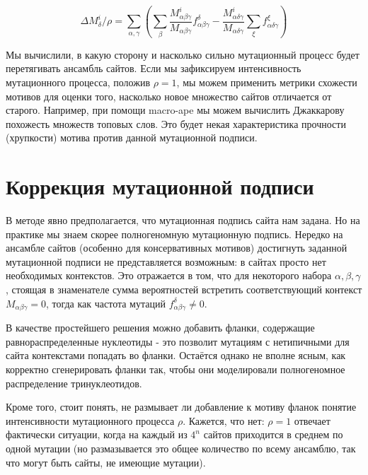 \documentclass[a4paper]{article}
\begin{document}
\begin{equation}
\boxed{
\Delta M^i_{\delta}/\rho = \sum_{\alpha,\gamma}\left(\sum_{\beta}\frac{M^i_{\alpha\beta\gamma}}{M_{\alpha\beta\gamma}}f_{\alpha\beta\gamma}^{\delta} - \frac{M^i_{\alpha\delta\gamma}}{M_{\alpha\delta\gamma}}\sum_{\xi}f_{\alpha\delta\gamma}^{\xi}\right)
}
\end{equation}

Мы вычислили, в какую сторону и насколько сильно мутационный процесс будет перетягивать ансамбль сайтов. Если мы зафиксируем интенсивность мутационного процесса, положив $\rho=1$, мы можем применить метрики схожести мотивов для оценки того, насколько новое множество сайтов отличается от старого. Например, при помощи macro-ape мы можем вычислить Джаккарову похожесть множеств топовых слов. Это будет некая характеристика прочности (хрупкости) мотива против данной мутационной подписи.


\section{Коррекция мутационной подписи}

В методе явно предполагается, что мутационная подпись сайта нам задана. Но на практике мы знаем скорее полногеномную мутационную подпись. Нередко на ансамбле сайтов (особенно для консервативных мотивов) достигнуть заданной мутационной подписи не представляется возможным: в сайтах просто нет необходимых контекстов. Это отражается в том, что для некоторого набора $\alpha, \beta, \gamma$, стоящая в знаменателе сумма вероятностей встретить соответствующий контекст $M_{\alpha\beta\gamma} = 0$, тогда как частота мутаций $f_{\alpha\beta\gamma}^{\delta}\ne 0$.

В качестве простейшего решения можно добавить фланки, содержащие равнораспределенные нуклеотиды - это позволит мутациям с нетипичными для сайта контекстами попадать во фланки. Остаётся однако не вполне ясным, как корректно сгенерировать фланки так, чтобы они моделировали полногеномное распределение тринуклеотидов.

Кроме того, стоит понять, не размывает ли добавление к мотиву фланок понятие интенсивности мутационного процесса $\rho$. Кажется, что нет: $\rho=1$ отвечает фактически ситуации, когда на каждый из $4^n$ сайтов приходится в среднем по одной мутации (но размазывается это общее количество по всему ансамблю, так что могут быть сайты, не имеющие мутации).
\end{document}
